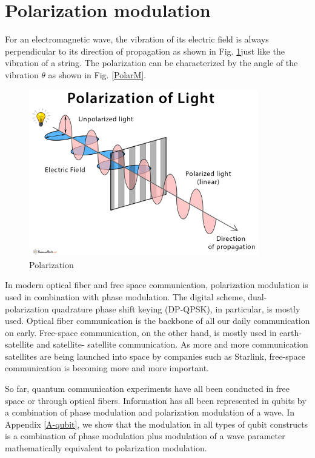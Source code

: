 \documentclass[oneside, letter, 12pt]{book}
\begin{document}
\section{Polarization modulation}
For an electromagnetic wave, the vibration of its electric field is always perpendicular to its direction of propagation as shown in Fig. \ref{Polarization}just like the vibration of a string. The polarization can be characterized by the angle of the vibration $\theta$ as shown in Fig. \ref{PolarM}.

\begin{figure}[ht]\label{Polarization}
\includegraphics[width=10cm]{pic/Polarization-of-Light.jpg}
\caption{Polarization}
\end{figure}

In modern optical fiber and free space communication, polarization modulation is used in combination with phase modulation. The digital scheme, dual-polarization quadrature phase shift keying (DP-QPSK), in particular, is mostly used. Optical fiber communication is the backbone of all our daily communication on early. Free-space communication, on the other hand, is mostly used in earth-satellite and satellite- satellite communication. As more and more communication satellites are being launched into space by companies such as Starlink, free-space communication is becoming more and more important.

So far, quantum communication experiments have all been conducted in free space or through optical fibers. Information has all been represented in qubits by a combination of phase modulation and polarization modulation of a wave. In Appendix \ref{A-qubit}, we show that the modulation in all types of qubit constructs is a combination of phase modulation plus modulation of a wave parameter mathematically equivalent to polarization modulation.
\end{document}
